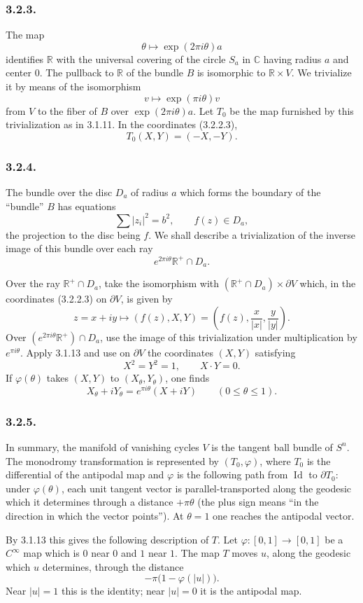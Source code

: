 \subsubsection*{3.2.3.}
The map
\[
\theta\longmapsto \exp(2\pi i\theta)a
\]
identifies $\mathbb R$ with the universal covering of the circle
$S_a$ in $\mathbb C$ having radius $a$ and center $0$.  The pullback
to $\mathbb R$ of the bundle $B$ is isomorphic to $\mathbb R\times V$.
We trivialize it by means of the isomorphism
\[
v\longmapsto \exp(\pi i\theta)v
\]
from $V$ to the fiber of $B$ over $\exp(2\pi i\theta)a$.  Let $T_0$
be the map furnished by this trivialization as in 3.1.11.  In the
coordinates (3.2.2.3),
\[
T_0(X,Y)=(-X,-Y).
\]

\subsubsection*{3.2.4.}
The bundle over the disc $D_a$ of radius $a$ which forms the boundary
of the ``bundle'' $B$ has equations
\[
\sum |z_i|^2=b^2,
\qquad
f(z)\in D_a,
\]
the projection to the disc being $f$.  We shall describe a
trivialization of the inverse image of this bundle over each ray
\[
e^{2\pi i\theta}\mathbb R^+\cap D_a.
\]

Over the ray $\mathbb R^+\cap D_a$, take the isomorphism with
$(\mathbb R^+\cap D_a)\times\partial V$ which, in the coordinates
(3.2.2.3) on $\partial V$, is given by
\[
z=x+iy\longmapsto(f(z),X,Y)
  =\left(f(z),\frac{x}{|x|},\frac{y}{|y|}\right).
\]
Over $(e^{2\pi i\theta}\mathbb R^+)\cap D_a$, use the image of this
trivialization under multiplication by $e^{\pi i\theta}$.  Apply
3.1.13 and use on $\partial V$ the coordinates $(X,Y)$ satisfying
\begin{equation}\tag{3.2.4.1}
X^2=Y^2=1,
\qquad
X\mathbin{\cdot}Y=0.
\end{equation}
If $\varphi(\theta)$ takes $(X,Y)$ to $(X_\theta,Y_\theta)$, one finds
\begin{equation}\tag{3.2.4.2}
X_\theta+iY_\theta
=e^{\pi i\theta}(X+iY)
\qquad(0\leq\theta\leq1).
\end{equation}

\subsubsection*{3.2.5.}
In summary, the manifold of vanishing cycles $V$ is the tangent ball
bundle of $S^n$.  The monodromy transformation is represented by
$(T_0,\varphi)$, where $T_0$ is the differential of the antipodal map
and $\varphi$ is the following path from $\operatorname{Id}$ to
$\partial T_0$: under $\varphi(\theta)$, each unit tangent vector is
parallel-transported along the geodesic which it determines through a
distance $+\pi\theta$ (the plus sign means ``in the direction in which
the vector points'').  At $\theta=1$ one reaches the antipodal vector.

By 3.1.13 this gives the following description of $T$.  Let
$\varphi:[0,1]\to[0,1]$ be a $C^\infty$ map which is $0$ near $0$ and
$1$ near $1$.  The map $T$ moves $u$, along the geodesic which $u$
determines, through the distance
\[
-\pi\bigl(1-\varphi(|u|)\bigr).
\]
Near $|u|=1$ this is the identity; near $|u|=0$ it is the antipodal
map.
